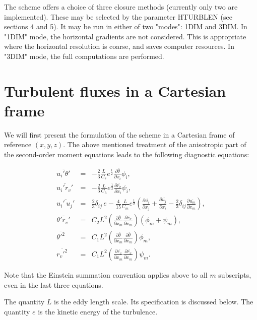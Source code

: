 The scheme offers a choice of three closure methods (currently only two
are implemented). These may be selected by the parameter HTURBLEN (see sections
4 and 5).  It may be run in either of two "modes": 1DIM and 3DIM.
In "1DIM" mode, the horizontal gradients are not considered. This is appropriate
where the horizontal resolution is coarse, and saves computer resources.
In "3DIM" mode, the full computations are performed.



\section{Turbulent fluxes in a Cartesian frame}

We will first present the formulation of the scheme in a Cartesian frame
of reference $(x,y,z)$.
The above mentioned treatment of the anisotropic part of the second-order
moment equations leads to the following diagnostic equations:

\begin{eqnarray}
%
\overline{u_i'\theta'}&=&-\frac{2}{3}\frac{L}{C_s}e^{\frac{1}{2}}\frac{\partial
 \overline{\theta}}{\partial x_i} \phi_i  , \\
%
\overline{u_i'r_v'}&=&-\frac{2}{3}\frac{L}{C_h}e^{\frac{1}{2}}\frac{\partial
 \overline{r_v}}{\partial x_i} \psi_i  ,  \\
%
\overline{u_i'\,u_j'}&=&\frac{2}{3}\delta_{ij}\,e -\frac{4}{15} \frac{L}{C_m} e^{\frac{1}{2}}
(\frac{\partial \overline{u_i}}{\partial x_j}+\frac{\partial \overline{u_j}}{\partial x_i}
-\frac{2}{3}\delta_{ij}\frac{\partial \overline{u_m}}{\partial x_m}), \\
%
\overline{\theta'r_v'}&=&C_2 L^2(\frac{\partial \overline{\theta}}{\partial x_m}
\frac{\partial \overline{r_v}}{\partial x_m})(\phi_m+\psi_m) ,\\
%
\overline{\theta'^2}&=&C_1 L^2(\frac{\partial \overline{\theta}}{\partial x_m}
\frac{\partial \overline{\theta}}{\partial x_m})\phi_m  ,\\
%
\overline{r_v'^2}&=&C_1 L^2(\frac{\partial \overline{r_v}}{\partial x_m}
\frac{\partial \overline{r_v}}{\partial x_m})\psi_m  .
%
\end{eqnarray}

\noindent
Note that the Einstein summation convention applies above to all $m$ subscripts, even in the last three equations.


The quantity $L$ is the eddy length scale. Its specification is discussed
below. The quantity $e$ is the kinetic energy of the turbulence.


